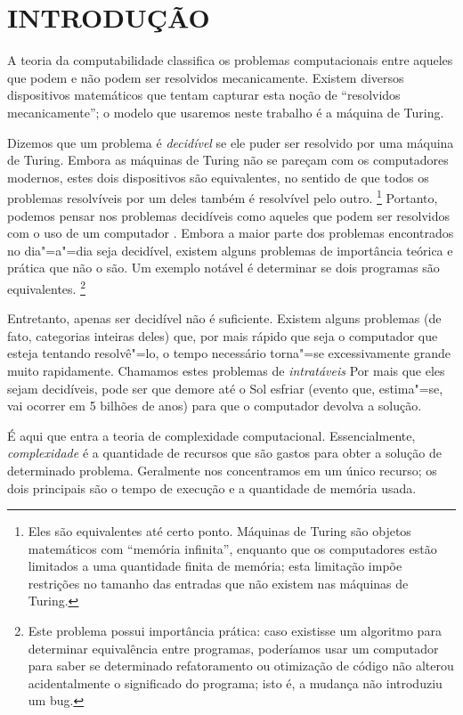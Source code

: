 \chapter{INTRODUÇÃO}

A teoria da computabilidade
classifica os problemas computacionais entre
aqueles que podem e não podem ser resolvidos mecanicamente.
Existem diversos dispositivos matemáticos
que tentam capturar esta noção de
``resolvidos mecanicamente'';
o modelo que usaremos neste trabalho é a máquina de Turing.

Dizemos que um problema é \emph{decidível}
se ele puder ser resolvido por uma máquina de Turing.
Embora as máquinas de Turing
não se pareçam com os computadores modernos,
estes dois dispositivos são equivalentes,
no sentido de que
todos os problemas resolvíveis por um deles
também é resolvível pelo outro.%
\footnote{
    Eles são equivalentes até certo ponto.
    Máquinas de Turing são objetos matemáticos
    com ``memória infinita'',
    enquanto que os computadores estão limitados
    a uma quantidade finita de memória;
    esta limitação impõe restrições no tamanho das entradas
    que não existem nas máquinas de Turing.
}
Portanto, podemos pensar nos problemas decidíveis
como aqueles que podem ser resolvidos com o uso de um computador
\cite[p.~307]{HopcroftMotwaniUllman2001}.
Embora a maior parte dos problemas
encontrados no dia"=a"=dia seja decidível,
existem alguns problemas de importância teórica e prática
que não o são.
Um exemplo notável é determinar se dois programas são equivalentes.%
\footnote{
    Este problema possui importância prática:
    caso existisse um algoritmo para determinar equivalência entre programas,
    poderíamos usar um computador para saber se
    determinado refatoramento ou otimização de código
    não alterou acidentalmente o significado do programa;
    isto é, a mudança não introduziu um bug.
}

Entretanto,
apenas ser decidível não é suficiente.
Existem alguns problemas
(de fato, categorias inteiras deles)
que, por mais rápido que seja o computador
que esteja tentando resolvê"=lo,
o tempo necessário torna"=se excessivamente grande
muito rapidamente.
Chamamos estes problemas de \emph{intratáveis}
\cite[p.~1]{HopcroftMotwaniUllman2001}
Por mais que eles sejam decidíveis,
pode ser que demore até o Sol esfriar
(evento que, estima"=se, vai ocorrer em 5 bilhões de anos)
para que o computador devolva a solução.

É aqui que entra a teoria de complexidade computacional.
Essencialmente,
\emph{complexidade}
é a quantidade de recursos que são gastos
para obter a solução de determinado problema.
Geralmente nos concentramos em um único recurso;
os dois principais são
o tempo de execução e a quantidade de memória usada.

